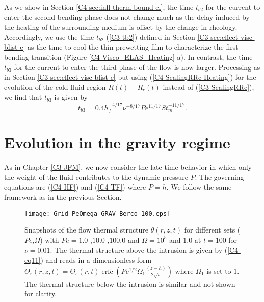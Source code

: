 As  we  show  in Section  \ref{C4-sec:infl-therm-bound-el},  the  time
$t_{b2}$ for  the current to enter  the second bending phase  does not
change much  as the delay  induced by  the heating of  the surrounding
medium is offset  by the change in rheology.  Accordingly,  we use the
time      $t_{b2}$     (\ref{C3-tb2})      defined     in      Section
\ref{C3-sec:effect-visc-blist-e}  as   the  time  to  cool   the  thin
prewetting film  to characterize the first  bending transition (Figure
\ref{C4-Visco_ELAS_Heating} a). In contrast, the time $t_{b3}$ for the
current to enter the third phase of the flow is now larger. Processing
as    in    Section   \ref{C3-sec:effect-visc-blist-e}    but    using
(\ref{C4-ScalingRRc-Heating})  for the  evolution  of  the cold  fluid
region $R(t)-R_c(t)$  instead of  (\ref{C3-ScalingRRc}), we  find that
$t_{b3}$ is given by
\begin{equation}
  t_{b3}=0.4h_f^{-4/17}\nu^{-8/17}Pe^{11/17}St_m^{-11/17}.
  \label{C4-tb3}
\end{equation}

\section{Evolution in the gravity regime}
\label{C4-sec:evol-grav-regime}

As in Chapter \ref{C3-JFM}, we now  consider the late time behavior in
which only the weight of the fluid contributes to the dynamic pressure
$P$. The governing equations are (\ref{C4-HF}) and (\ref{C4-TF}) where
$P=h$. We follow the same framework as in the previous Section.

\begin{figure}[h!]
  \begin{center}
    \graphicspath{ {/Users/thorey/Documents/These/Projet/Refroidissement/Skin_Model/Figure/Figure_Heating/} }
    \texttt{[image: Grid\_PeOmega\_GRAV\_Berco\_100.eps]}
    \caption{Snapshots of  the flow thermal  structure $\theta(r,z,t)$
      for  different  sets  ($Pe$,$\Omega$)  with  $Pe=  1.0$  ,$10.0$
      ,$100.0$   and   $\Omega=10^5$   and  $1.0$   at   $t=100$   for
      $\nu=0.01$. The  thermal structure above the  intrusion is given
      by   (\ref{C4-eq11})  and   reads   in   a  dimensionless   form
      $\Theta_r(r,z,t)=\Theta_s(r,t)\operatorname{erfc}{\left(Pe^{1/2}\Omega_1\frac{(z-h)}{2\sqrt{t}}\right)}$
      where $\Omega_1$ is set to  $1$. The thermal structure below the
      intrusion is similar and not shown for clarity.}
    \label{C4-Grid_PeOmega_Heating_GRAV}
  \end{center}
\end{figure}


